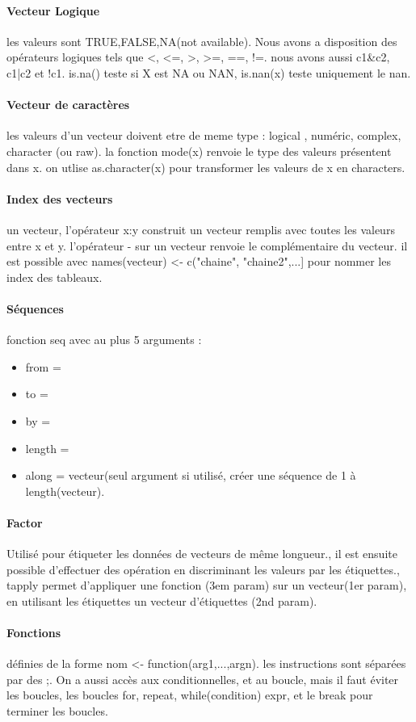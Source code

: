 \documentclass{article}
\begin{document}
\paragraph{Vecteur Logique} les valeurs sont TRUE,FALSE,NA(not available). Nous avons a disposition des opérateurs logiques tels que <, <=, >, >=, ==, !=. nous avons aussi c1\&c2, c1|c2 et !c1. is.na() teste si X est NA ou NAN, is.nan(x) teste uniquement le nan.
\paragraph{Vecteur de caractères} les valeurs d'un vecteur doivent etre de meme type : logical , numéric, complex, character (ou raw). la fonction mode(x) renvoie le type des valeurs présentent dans x. on utlise as.character(x) pour transformer les valeurs de x en characters.
\paragraph{Index des vecteurs} un vecteur, l'opérateur x:y construit un vecteur remplis avec toutes les valeurs entre x et y. l’opérateur  - sur un vecteur renvoie le complémentaire du vecteur. il est possible avec names(vecteur) <- c("chaine", "chaine2",...] pour nommer les index des tableaux.
\paragraph{Séquences} fonction seq avec au plus 5 arguments : 
\begin{itemize}
\item from =
\item to = 
\item by = 
\item length = 
\item along = vecteur(seul argument si utilisé, créer une séquence de  1 à length(vecteur).
\end{itemize}

\paragraph{Factor} Utilisé pour étiqueter les données de vecteurs de même longueur., il est ensuite possible d'effectuer des opération en discriminant les valeurs par les étiquettes., tapply permet d'appliquer une fonction (3em param) sur un vecteur(1er param), en utilisant les étiquettes un vecteur d'étiquettes (2nd param).
\paragraph{Fonctions} définies de la forme nom <- function(arg1,...,argn). les instructions sont séparées par des ;. On a aussi accès aux conditionnelles, et au boucle, mais il faut éviter les boucles, les boucles for, repeat, while(condition) expr, et le break pour terminer les boucles.
\end{document}
